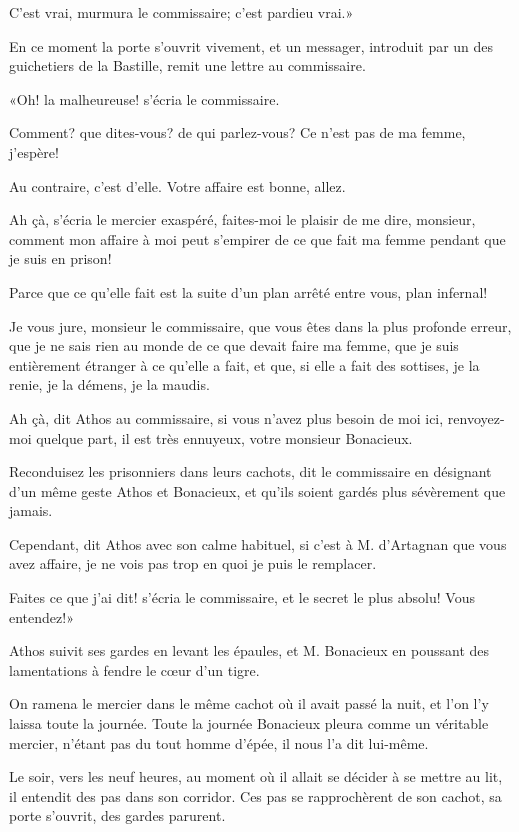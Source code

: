 \speak  C'est vrai, murmura le commissaire; c'est pardieu vrai.» 

En ce moment la porte s'ouvrit vivement, et un messager, introduit par un des guichetiers de la Bastille, remit une lettre au commissaire. 

«Oh! la malheureuse! s'écria le commissaire. 

\speak  Comment? que dites-vous? de qui parlez-vous? Ce n'est pas de ma femme, j'espère! 

\speak  Au contraire, c'est d'elle. Votre affaire est bonne, allez. 

\speak  Ah çà, s'écria le mercier exaspéré, faites-moi le plaisir de me dire, monsieur, comment mon affaire à moi peut s'empirer de ce que fait ma femme pendant que je suis en prison! 

\speak  Parce que ce qu'elle fait est la suite d'un plan arrêté entre vous, plan infernal! 

\speak  Je vous jure, monsieur le commissaire, que vous êtes dans la plus profonde erreur, que je ne sais rien au monde de ce que devait faire ma femme, que je suis entièrement étranger à ce qu'elle a fait, et que, si elle a fait des sottises, je la renie, je la démens, je la maudis. 

\speak  Ah çà, dit Athos au commissaire, si vous n'avez plus besoin de moi ici, renvoyez-moi quelque part, il est très ennuyeux, votre monsieur Bonacieux. 

\speak  Reconduisez les prisonniers dans leurs cachots, dit le commissaire en désignant d'un même geste Athos et Bonacieux, et qu'ils soient gardés plus sévèrement que jamais. 

\speak  Cependant, dit Athos avec son calme habituel, si c'est à M. d'Artagnan que vous avez affaire, je ne vois pas trop en quoi je puis le remplacer. 

\speak  Faites ce que j'ai dit! s'écria le commissaire, et le secret le plus absolu! Vous entendez!» 

Athos suivit ses gardes en levant les épaules, et M. Bonacieux en poussant des lamentations à fendre le cœur d'un tigre. 

On ramena le mercier dans le même cachot où il avait passé la nuit, et l'on l'y laissa toute la journée. Toute la journée Bonacieux pleura comme un véritable mercier, n'étant pas du tout homme d'épée, il nous l'a dit lui-même. 

Le soir, vers les neuf heures, au moment où il allait se décider à se mettre au lit, il entendit des pas dans son corridor. Ces pas se rapprochèrent de son cachot, sa porte s'ouvrit, des gardes parurent. 

